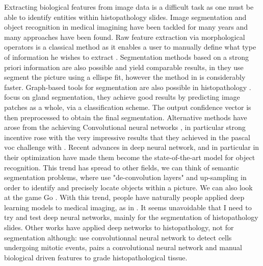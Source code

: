\documentclass[a4paper,10pt]{article}
\begin{document}
Extracting biological features from image data is a difficult task as one must be able to identify entities within histopathology slides. Image segmentation and object recognition in medical imagining have been tackled for many years and many approaches have been found. Raw feature extraction via morphological operators is a classical method as it enables a user to manually define what type of information he wishes to extract \citep{irshad2014methods}. Segmentation methods based on a strong priori information are also possible and yield comparable results, in \citet{ranefall2016fast} they use segment the picture using a ellispe fit, however the method in \citep{ranefall2016fast} is considerably faster. Graph-based tools for segmentation are also possible in histopathology \citep{ta2009graph}. \citet{manivannanlocal} focus on gland segmentation, they achieve good results by predicting image patches as a whole, via a classification scheme. The output confidence vector is then preprocessed to obtain the final segmentation. Alternative methods have arose from the achieving Convolutional neural networks \citep{lecun}, in particular strong incentive rose with the very impressive results that they achieved in the pascal voc challenge with \citet{ImageNet}. Recent advances in deep neural network, and in particular in their optimization have made them become the state-of-the-art model for object recognition. 
This trend has spread to other fields, we can think of semantic segmentation problems, where \citet{long2015fcn} use "de-convolution layers" and up-sampling in order to identify and precisely locate objects within a picture. We can also look at the game Go 
\citep{AlphaGo}. With this trend, people have naturally people applied deep learning models to medical imaging, as in \citet{UNet}. It seems unavoidable that I need to try and test deep neural networks, mainly for the segmentation of histopathology slides.
Other works have applied deep networks to histopathology, not for segmentation although: \citet{cirecsan2013mitosis} use convolutionnal neural network to detect cells undergoing mitotic events, \citet{jiajia2016automatic} pairs a convolutional neural network and manual biological driven features to grade histopathological tissue.
\end{document}
